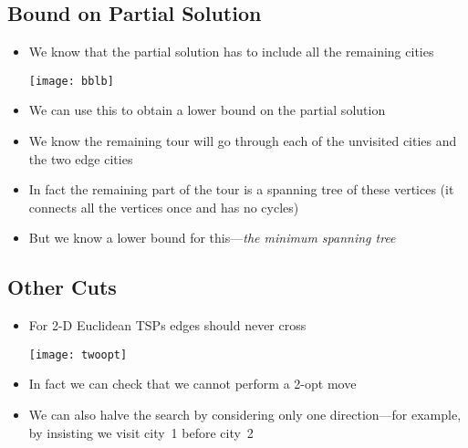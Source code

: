 \begin{slide}
\section[-2]{Bound on Partial Solution}

\begin{PauseHighLight}
  \begin{itemize}\squeeze
  \item We know that the partial solution has to include all the
    remaining cities
    \begin{center}
      \texttt{[image: bblb]}\pause
    \end{center}
  \item We can use this to obtain a lower bound on the partial
    solution\pause
  \item We know the remaining tour will go through each of the unvisited
    cities and the two edge cities\pause
  \item In fact the remaining part of the tour is a spanning tree of
    these vertices (it connects all the vertices once and has no
    cycles)\pause
  \item But we know a lower bound for this\pause---\emph{the minimum
      spanning tree}\pauseb
  \end{itemize}
\end{PauseHighLight}

\end{slide}


\begin{slide}
\section{Other Cuts}

\begin{PauseHighLight}
  \begin{itemize}
  \item For 2-D Euclidean TSPs edges should never cross\pause
    \begin{center}
      \texttt{[image: twoopt]}\pause
    \end{center}
  \item In fact we can check that we cannot perform a 2-opt move\pause
  \item We can also halve the search by considering only one
  direction---for example, by insisting we visit city~1 before city~2\pause
  \end{itemize}
\end{PauseHighLight}

\end{slide}

